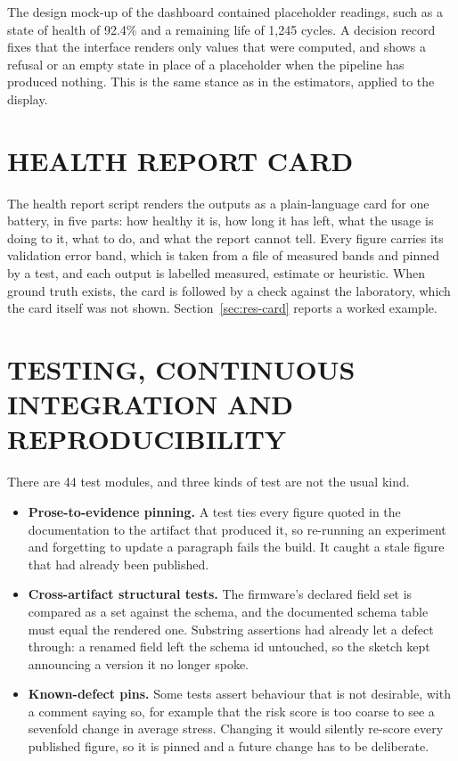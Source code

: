 \documentclass[12pt,a4paper]{amritareport}
\begin{document}
The design mock-up of the dashboard contained placeholder readings, such as a state of health of 92.4\% and a remaining life of 1,245 cycles. A decision record fixes that the interface renders only values that were computed, and shows a refusal or an empty state in place of a placeholder when the pipeline has produced nothing. This is the same stance as in the estimators, applied to the display.

\section{HEALTH REPORT CARD}
\label{sec:impl-card}

The health report script renders the outputs as a plain-language card for one battery, in five parts: how healthy it is, how long it has left, what the usage is doing to it, what to do, and what the report cannot tell. Every figure carries its validation error band, which is taken from a file of measured bands and pinned by a test, and each output is labelled measured, estimate or heuristic. When ground truth exists, the card is followed by a check against the laboratory, which the card itself was not shown. Section~\ref{sec:res-card} reports a worked example.

\section{TESTING, CONTINUOUS INTEGRATION AND REPRODUCIBILITY}
\label{sec:impl-test}

There are 44 test modules, and three kinds of test are not the usual kind.

\begin{itemize}
    \item \textbf{Prose-to-evidence pinning.} A test ties every figure quoted in the documentation to the artifact that produced it, so re-running an experiment and forgetting to update a paragraph fails the build. It caught a stale figure that had already been published.
    \item \textbf{Cross-artifact structural tests.} The firmware's declared field set is compared as a set against the schema, and the documented schema table must equal the rendered one. Substring assertions had already let a defect through: a renamed field left the schema id untouched, so the sketch kept announcing a version it no longer spoke.
    \item \textbf{Known-defect pins.} Some tests assert behaviour that is not desirable, with a comment saying so, for example that the risk score is too coarse to see a sevenfold change in average stress. Changing it would silently re-score every published figure, so it is pinned and a future change has to be deliberate.
\end{itemize}
\end{document}
